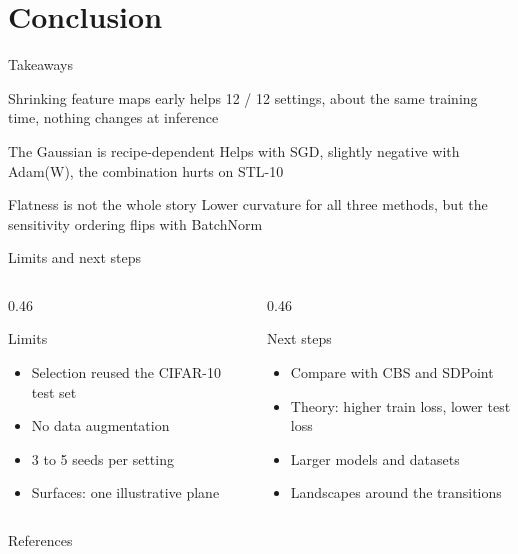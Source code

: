 \documentclass[10pt,aspectratio=169]{beamer}
\begin{document}
\section{Conclusion}
\begin{frame}{Takeaways}
\begin{block}{Shrinking feature maps early helps}
  12 / 12 settings, about the same training time, nothing changes at inference
\end{block}
\begin{block}{The Gaussian is recipe-dependent}
  Helps with SGD, slightly negative with Adam(W), the combination hurts on STL-10
\end{block}
\begin{block}{Flatness is not the whole story}
  Lower curvature for all three methods, but the sensitivity ordering flips with BatchNorm
\end{block}
\end{frame}

\begin{frame}{Limits and next steps}
\begin{columns}[T]
\begin{column}{0.46\textwidth}
  \begin{alertblock}{Limits}
  \begin{itemize}
    \item Selection reused the CIFAR-10 test set
    \item No data augmentation
    \item 3 to 5 seeds per setting
    \item Surfaces: one illustrative plane
  \end{itemize}
  \end{alertblock}
\end{column}
\begin{column}{0.46\textwidth}
  \begin{block}{Next steps}
  \begin{itemize}
    \item Compare with CBS and SDPoint
    \item Theory: higher train loss, lower test loss
    \item Larger models and datasets
    \item Landscapes around the transitions
  \end{itemize}
  \end{block}
\end{column}
\end{columns}
\end{frame}

\nocite{*}
\begin{frame}[allowframebreaks]{References}
    \printbibliography
\end{frame}
\end{document}
